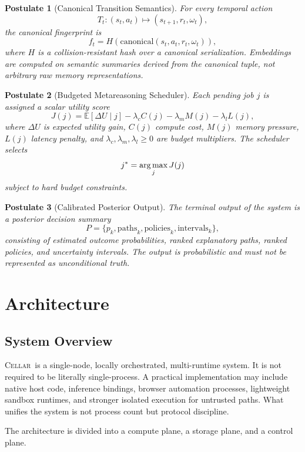 \documentclass[11pt]{article}
\newtheorem{postulate}{Postulate}
\theoremstyle{definition}
\newcommand{\E}{\mathbb{E}}
\newcommand{\argmax}{\operatornamewithlimits{arg\,max}}
\newcommand{\cellar}{\textsc{Cellar}}
\begin{document}
\begin{postulate}[Canonical Transition Semantics]
For every temporal action
\[
T_t : (s_t, a_t) \mapsto (s_{t+1}, r_t, \omega_t),
\]
the canonical fingerprint is
\[
f_t = H(\mathrm{canonical}(s_t, a_t, r_t, \omega_t)),
\]
where \(H\) is a collision-resistant hash over a canonical serialization. Embeddings are computed on semantic summaries derived from the canonical tuple, not arbitrary raw memory representations.
\end{postulate}

\begin{postulate}[Budgeted Metareasoning Scheduler]
Each pending job \(j\) is assigned a scalar utility score
\[
J(j) = \E[\Delta U \mid j] - \lambda_c C(j) - \lambda_m M(j) - \lambda_l L(j),
\]
where \(\Delta U\) is expected utility gain, \(C(j)\) compute cost, \(M(j)\) memory pressure, \(L(j)\) latency penalty, and \(\lambda_c,\lambda_m,\lambda_l \ge 0\) are budget multipliers. The scheduler selects
\[
j^* = \argmax_j J(j)
\]
subject to hard budget constraints.
\end{postulate}

\begin{postulate}[Calibrated Posterior Output]
The terminal output of the system is a posterior decision summary
\[
P = \{p_k, \mathrm{paths}_k, \mathrm{policies}_k, \mathrm{intervals}_k\},
\]
consisting of estimated outcome probabilities, ranked explanatory paths, ranked policies, and uncertainty intervals. The output is probabilistic and must not be represented as unconditional truth.
\end{postulate}

\section{Architecture}

\subsection{System Overview}

\cellar\ is a single-node, locally orchestrated, multi-runtime system. It is not required to be literally single-process. A practical implementation may include native host code, inference bindings, browser automation processes, lightweight sandbox runtimes, and stronger isolated execution for untrusted paths. What unifies the system is not process count but protocol discipline.

The architecture is divided into a compute plane, a storage plane, and a control plane.
\end{document}
